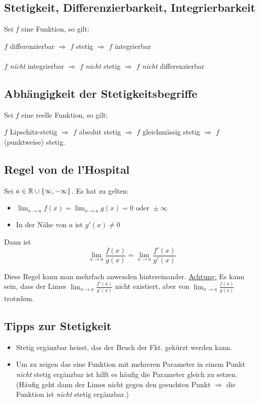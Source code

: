 \subsection{Stetigkeit, Differenzierbarkeit, Integrierbarkeit}
Sei $f$ eine Funktion, so gilt:

$f$ differenzierbar $\Rightarrow$ $f$ stetig $\Rightarrow$ $f$ integrierbar\\
\\
$f$ \emph{nicht} integrierbar $\Rightarrow$ $f$ \emph{nicht} stetig $\Rightarrow$ 
$f$ \emph{nicht} differenzierbar  

\subsection{Abhängigkeit der Stetigkeitsbegriffe}
Sei $f$ eine reelle Funktion, so gilt:

$f$ Lipschitz-stetig $\Rightarrow$ $f$ absolut stetig $\Rightarrow$ $f$
gleichmässig stetig $\Rightarrow$ $f$ (punktweise) stetig.

\subsection{Regel von de l'Hospital}
Sei $a \in \mathbb{R} \cup \{\infty, -\infty\}$. Es hat zu gelten:
\begin{itemize}
  \item $\lim_{x \to a} f(x) = \lim_{x \to a} g(x) = 0 \text{ oder } \pm\infty$
  \item In der Nähe von $a$ ist $g'(x) \neq 0$
\end{itemize}

Dann ist
\[
\lim_{x \to a} \frac{f(x)}{g(x)} = \lim_{x \to a}
\frac{f'(x)}{g'(x)}
\]

Diese Regel kann man mehrfach anwenden hintereinander. \underline{Achtung:} Es
kann sein, dass der Limes $\lim_{x \to a} \frac{f'(x)}{g'(x)}$ nicht existiert,
aber von $\lim_{x \to a} \frac{f(x)}{g(x)}$ trotzdem.


\subsection{Tipps zur Stetigkeit}
\begin{itemize}
	\item Stetig ergänzbar heisst, das der Bruch der Fkt. gekürzt werden kann.
  \item Um zu zeigen das eine Funktion mit mehreren Parameter in einem Punkt \emph{nicht} stetig ergänzbar ist
	hilft es häufig die Parameter gleich zu setzen. (Häufig geht dann der Limes nicht gegen den gesuchten Punkt
	 $\Rightarrow$ die Funktion ist \emph{nicht} stetig ergänzbar.)
\end{itemize}
